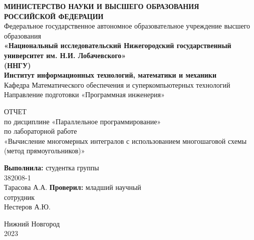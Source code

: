 \documentclass[14pt, a4paper]{extarticle}
\title{}
\author{}
\date{}
\begin{document}
  \begin{titlepage}
    \begin{center}
      {\bfseries МИНИСТЕРСТВО НАУКИ И ВЫСШЕГО ОБРАЗОВАНИЯ \\
        РОССИЙСКОЙ ФЕДЕРАЦИИ}
      \\
      Федеральное государственное автономное образовательное учреждение высшего образования
      \\
      {\bfseries «Национальный исследовательский Нижегородский государственный университет им. Н.И. Лобачевского»\\(ННГУ)
        \\Институт информационных технологий, математики и механики} \\ Кафедра Математического обеспечения и суперкомпьютерных технологий \\ Направление подготовки «Программная инженерия»
    \end{center}

    \vspace{8em}

    \begin{center}
      ОТЧЕТ \\ по дисциплине «Параллельное программирование» \\ по лабораторной работе \\
      «Вычисление многомерных интегралов с использованием многошаговой схемы (метод прямоугольников)»
    \end{center}

    \vspace{5em}


    \begin{flushright}
      {\bfseries Выполнила:} студентка группы\\382008-1\\Тарасова А.А. \linebreak\linebreak\linebreak
      {\bfseries Проверил:} младший научный\\сотрудник\\Нестеров А.Ю.  
    \end{flushright}


    \vspace{\fill}

    \begin{center}
      Нижний Новгород\\2023
    \end{center}

  \end{titlepage}
\end{document}
